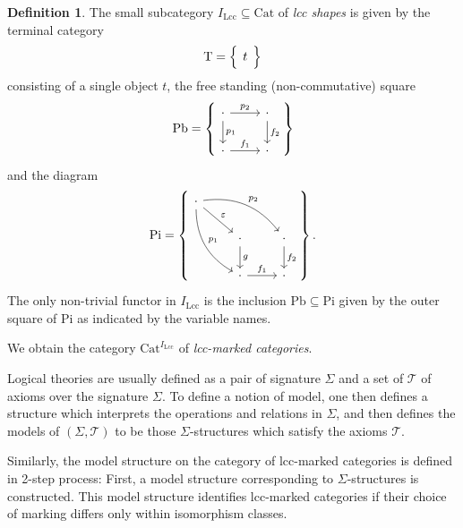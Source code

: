 \documentclass{article}
\theoremstyle{remark}
\theoremstyle{definition}
\newtheorem{definition}{Definition}
\begin{document}
\begin{definition}
  The small subcategory $I_\mathrm{Lcc} \subseteq \mathrm{Cat}$ of \emph{lcc shapes} is given by the terminal category 
  \begin{equation}
    \mathrm{T} =
    \left\{
      \begin{tikzcd}
        t
      \end{tikzcd}
    \right\}
  \end{equation}
  consisting of a single object $t$, the free standing (non-commutative) square
  \begin{equation}
    \mathrm{Pb} =
    \left\{
      \begin{tikzcd}
        \cdot \arrow[d, "p_1"] \arrow[r, "p_2"] & \cdot \arrow[d, "f_2"] \\
        \cdot \arrow[r, "f_1"] & \cdot
      \end{tikzcd}
    \right\}
  \end{equation}
  and the diagram
  \begin{equation}
    \mathrm{Pi} =
    \left\{
      \begin{tikzcd}
        \cdot \arrow[ddr, bend right, "p_1"] \arrow[drr, bend left, "p_2"] \arrow[dr, "\varepsilon"] \\
        & \cdot \arrow[d, "g"] & \cdot \arrow[d, "f_2"] \\
        & \cdot \arrow[r, "f_1"] & \cdot
      \end{tikzcd}
    \right\}.
  \end{equation}
  The only non-trivial functor in $I_\mathrm{Lcc}$ is the inclusion $\mathrm{Pb} \subseteq \mathrm{Pi}$ given by the outer square of $\mathrm{Pi}$ as indicated by the variable names.

  We obtain the category $\mathrm{Cat}^{I_\mathrm{Lcc}}$ of \emph{lcc-marked categories}.
\end{definition}

Logical theories are usually defined as a pair of signature $\Sigma$ and a set of $\mathcal{T}$ of axioms over the signature $\Sigma$.
To define a notion of model, one then defines a structure which interprets the operations and relations in $\Sigma$, and then defines the models of $(\Sigma, \mathcal{T})$ to be those $\Sigma$-structures which satisfy the axioms $\mathcal{T}$.

Similarly, the model structure on the category of lcc-marked categories is defined in 2-step process:
First, a model structure corresponding to $\Sigma$-structures is constructed.
This model structure identifies lcc-marked categories if their choice of marking differs only within isomorphism classes.
\end{document}
